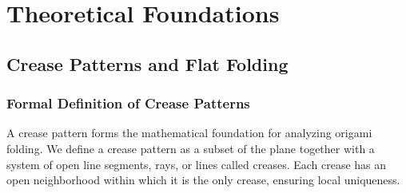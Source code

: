 

\chapter{Theoretical Foundations}

\section{Crease Patterns and Flat Folding}

\subsection{Formal Definition of Crease Patterns}

A crease pattern forms the mathematical foundation for analyzing origami folding. We define a crease pattern as a subset of the plane together with a system of open line segments, rays, or lines called creases. Each crease has an open neighborhood within which it is the only crease, ensuring local uniqueness.

